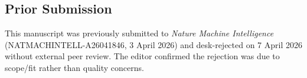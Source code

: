 \documentclass[sn-basic]{sn-jnl}
\theoremstyle{definition}
\begin{document}
\subsection*{Prior Submission}
This manuscript was previously submitted to \emph{Nature Machine Intelligence} (NATMACHINTELL-A26041846, 3 April 2026) and desk-rejected on 7 April 2026 without external peer review. The editor confirmed the rejection was due to scope/fit rather than quality concerns.


\end{document}
